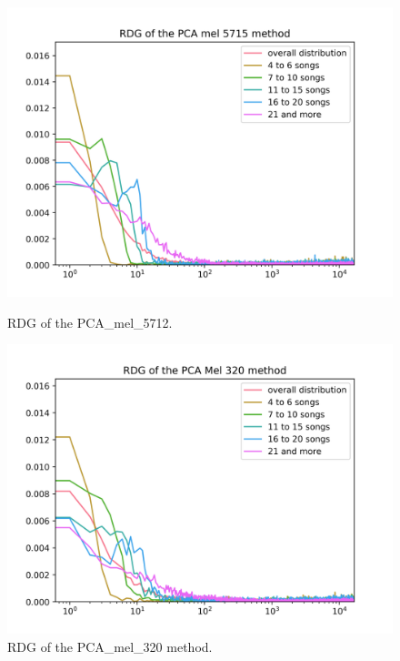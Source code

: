 \begin{figure}[h]
\centering
\begin{minipage}{.45\textwidth}
  \centering
  \includegraphics[width=1\linewidth]{./img/pca_mel_5715_graph.png}
  \caption[RDG of the PCA\_mel\_5712]{RDG of the \newline PCA\_mel\_5712.}
  \label{fig:pca_mel_5715_distribution}
\end{minipage}
 \vspace{1cm}
\begin{minipage}{.45\textwidth}
  \centering
  \includegraphics[width=1\linewidth]{./img/pca_mel_320_graph.png}
  \caption[RDG of the PCA\_mel\_320 method]{RDG of the \newline PCA\_mel\_320 method.}
  \label{fig:pca_mel_320_distribution}
\end{minipage}
\end{figure}\label{fig:pca_mel_comparison_graps}

